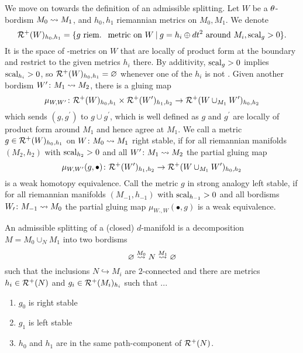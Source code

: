 We move on towards the definition of an admissible splitting.
Let $W$ be a $\theta$-bordism $M_0\rightsquigarrow M_1$, and $h_0,h_1$ riemannian metrics on $M_0,M_1$. 
We denote 
\begin{equation*}
    \mathcal{R}^+(W)_{h_0,h_1} = \{ g \text{ riem.~ metric on } W \:\vert\: g = h_i\oplus dt^2 \text{ around } M_i, \mathrm{scal}_g >0\}.
\end{equation*}
It is the space of \psc-metrics on $W$ that are locally of product form at the boundary and restrict to the given metrics $h_i$ there.
By additivity, $\mathrm{scal}_g > 0$ implies $\mathrm{scal}_{h_i} > 0$, so $\mathcal{R}^+(W)_{h_0,h_1} = \varnothing$ whenever one of the $h_i$ is not \psc.
Given another bordism $W^\prime\colon M_1 \rightsquigarrow M_2$, there is a gluing map 
\begin{equation*}
    \mu_{W,W^\prime}\colon \mathcal{R}^+(W)_{h_0,h_1} \times \mathcal{R}^+(W^\prime)_{h_1,h_2} \to \mathcal{R}^+(W\cup_{M_1} W^\prime)_{h_0,h_2}
\end{equation*}
which sends $(g,g^\prime)$ to $g\cup g^\prime$, which is well defined as $g$ and $g^\prime$ are locally of product form around $M_1$ and hence agree at $M_1$.
We call a metric $g\in\mathcal{R}^+(W)_{h_0,h_1}$ on $W\colon M_0\rightsquigarrow M_1$ right stable, if for all riemannian manifolds $(M_2,h_2)$ with $\mathrm{scal}_{h_2}>0$ and all $W^\prime\colon M_1 \rightsquigarrow M_2$ the partial gluing map
\begin{equation*}
    \mu_{W,W^\prime}(g,\bullet)\colon \mathcal{R}^+(W^\prime)_{h_1,h_2} \to \mathcal{R}^+(W\cup_{M_1} W^\prime)_{h_0,h_2}
\end{equation*}
is a weak homotopy equivalence.
Call the metric $g$ in strong analogy left stable, if for all riemannian manifolds $(M_{-1},h_{-1})$ with $\mathrm{scal}_{h_{-1}}>0$ and all bordisms $W_\prime\colon M_{-1}\rightsquigarrow M_0$ the partial gluing map $\mu_{W_\prime,W}(\bullet,g)$ is a weak equivalence.
\begin{defi}
    An admissible splitting of a (closed) $d$-manifold is a decomposition $M = M_0\cup_{N} M_1$ into two bordisms
    \begin{equation*}
        \varnothing \overset{M_0}{\rightsquigarrow} N \overset{M_1}{\rightsquigarrow} \varnothing
    \end{equation*}
    such that the inclusions $N\hookrightarrow M_i$ are $2$-connected and there are metrics $h_i\in\mathcal{R}^+(N)$ and $g_i \in \mathcal{R}^+(M_i)_{h_i}$ such that ...
    \begin{enumerate}[noitemsep, label=...]
        \item $g_0$ is right stable
        \item $g_1$ is left stable
        \item $h_0$ and $h_1$ are in the same path-component of $\mathcal{R}^+(N)$.
    \end{enumerate}
\end{defi}
